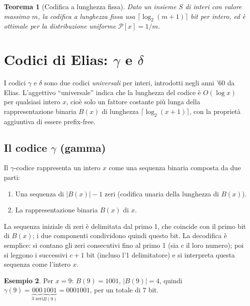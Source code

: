 \documentclass[12pt, a4paper, oneside]{book}
\theoremstyle{plain}
\newtheorem{teorema}{Teorema}[chapter]
\theoremstyle{definition}
\newtheorem{esempio}[teorema]{Esempio}
\theoremstyle{remark}
\begin{document}
\begin{teorema}[Codifica a lunghezza fissa]
\label{thm:fixed-length}
Dato un insieme $S$ di interi con valore massimo $m$, la codifica a lunghezza fissa usa $\lceil \log_2(m+1) \rceil$ bit per intero, ed è ottimale per la distribuzione uniforme $\mathcal{P}[x] = 1/m$.
\end{teorema}

\section{Codici di Elias: $\gamma$ e $\delta$}
\label{sec:elias-codes}

I codici $\gamma$ e $\delta$ sono due codici \emph{universali} per interi, introdotti negli anni '60 da Elias. L'aggettivo ``universale'' indica che la lunghezza del codice è $O(\log x)$ per qualsiasi intero $x$, cioè solo un fattore costante più lunga della rappresentazione binaria $B(x)$ di lunghezza $\lceil \log_2(x+1) \rceil$, con la proprietà aggiuntiva di essere prefix-free.

\subsection{Il codice $\gamma$ (gamma)}

Il $\gamma$-codice rappresenta un intero $x$ come una sequenza binaria composta da due parti:
\begin{enumerate}
  \item Una sequenza di $|B(x)| - 1$ zeri (codifica unaria della lunghezza di $B(x)$).
  \item La rappresentazione binaria $B(x)$ di $x$.
\end{enumerate}
La sequenza iniziale di zeri è delimitata dal primo 1, che coincide con il primo bit di $B(x)$; i due componenti condividono quindi questo bit. La decodifica è semplice: si contano gli zeri consecutivi fino al primo 1 (sia $c$ il loro numero); poi si leggono i successivi $c + 1$ bit (incluso l'1 delimitatore) e si interpreta questa sequenza come l'intero $x$.

\begin{esempio}
Per $x = 9$: $B(9) = 1001$, $|B(9)| = 4$, quindi $\gamma(9) = \underbrace{000}_{3 \text{ zeri}} \underbrace{1001}_{B(9)} = 0001001$, per un totale di $7$ bit.
\end{esempio}
\end{document}
